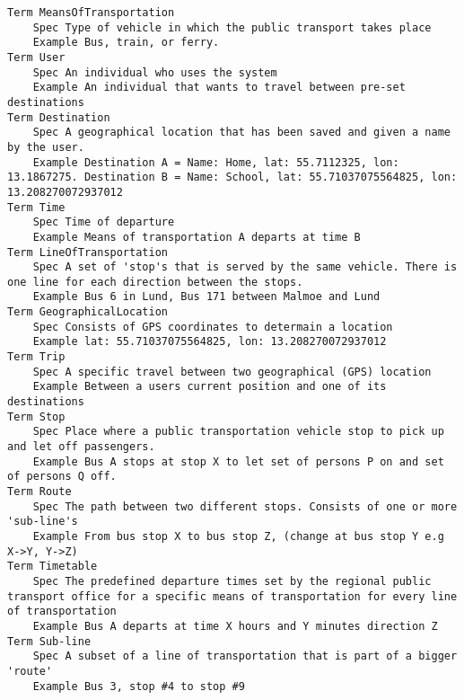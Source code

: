 

\begin{lstlisting}
Term MeansOfTransportation
	Spec Type of vehicle in which the public transport takes place
	Example Bus, train, or ferry.
Term User
	Spec An individual who uses the system
	Example An individual that wants to travel between pre-set destinations
Term Destination
	Spec A geographical location that has been saved and given a name by the user.
	Example Destination A = Name: Home, lat: 55.7112325, lon: 13.1867275. Destination B = Name: School, lat: 55.71037075564825, lon: 13.208270072937012
Term Time
	Spec Time of departure
	Example Means of transportation A departs at time B
Term LineOfTransportation
	Spec A set of 'stop's that is served by the same vehicle. There is one line for each direction between the stops.
	Example Bus 6 in Lund, Bus 171 between Malmoe and Lund
Term GeographicalLocation
	Spec Consists of GPS coordinates to determain a location
	Example lat: 55.71037075564825, lon: 13.208270072937012
Term Trip
	Spec A specific travel between two geographical (GPS) location
	Example Between a users current position and one of its destinations
Term Stop
	Spec Place where a public transportation vehicle stop to pick up and let off passengers.
	Example Bus A stops at stop X to let set of persons P on and set of persons Q off.
Term Route
	Spec The path between two different stops. Consists of one or more 'sub-line's
	Example From bus stop X to bus stop Z, (change at bus stop Y e.g X->Y, Y->Z)
Term Timetable
	Spec The predefined departure times set by the regional public transport office for a specific means of transportation for every line of transportation
	Example Bus A departs at time X hours and Y minutes direction Z
Term Sub-line
	Spec A subset of a line of transportation that is part of a bigger 'route'
	Example Bus 3, stop #4 to stop #9

\end{lstlisting}
